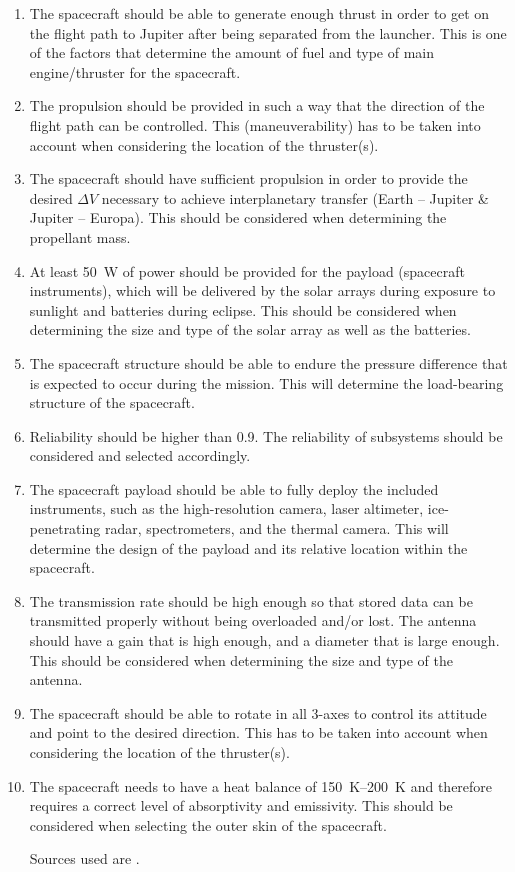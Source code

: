 \begin{enumerate}
\item The spacecraft should be able to generate enough thrust in order
  to get on the flight path to Jupiter after being separated from the
  launcher. This is one of the factors that determine the amount of
  fuel and type of main engine/thruster for the spacecraft.
\item The propulsion should be provided in such a way that the
  direction of the flight path can be controlled. This
  (maneuverability) has to be taken into account when considering the
  location of the thruster(s).
\item The spacecraft should have sufficient propulsion in order to
  provide the desired $\Delta V$ necessary to achieve interplanetary
  transfer (Earth -- Jupiter \& Jupiter -- Europa). This should be
  considered when determining the propellant mass.
\item At least \SI{50}{W} of power should be provided for the payload
  (spacecraft instruments), which will be delivered by the solar
  arrays during exposure to sunlight and batteries during eclipse.
  This should be considered when determining the size and type of the
  solar array as well as the batteries.
\item The spacecraft structure should be able to endure the pressure
  difference that is expected to occur during the mission. This will
  determine the load-bearing structure of the spacecraft.
\item Reliability should be higher than 0.9. The reliability of
  subsystems should be considered and selected accordingly.
\item The spacecraft payload should be able to fully deploy the
  included instruments, such as the high-resolution camera, laser
  altimeter, ice-penetrating radar, spectrometers, and the thermal
  camera. This will determine the design of the payload and its
  relative location within the spacecraft.
\item The transmission rate should be high enough so that stored data
  can be transmitted properly without being overloaded and/or lost.
  The antenna should have a gain that is high enough, and a diameter
  that is large enough. This should be considered when determining the
  size and type of the antenna.
\item The spacecraft should be able to rotate in all 3-axes to control
  its attitude and point to the desired direction. This has to be
  taken into account when considering the location of the thruster(s).
\item The spacecraft needs to have a heat balance of
  \SI{150}{K}--\SI{200}{K} and therefore requires a correct level of
  absorptivity and emissivity. This should be considered when
  selecting the outer skin of the spacecraft.

  Sources used are \cite{ae2100reader,fortescue2011spacecraft}.

\end{enumerate}
